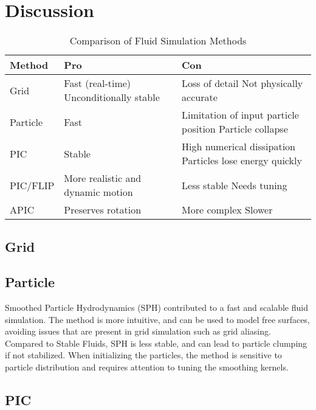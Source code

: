 \section{Discussion}
\begin{table}[!htbp]
\centering
\caption{Comparison of Fluid Simulation Methods}
\label{tab:fluid_comparison}
\begin{tabularx}{\columnwidth}{l X X}
\toprule
\textbf{Method} & \textbf{Pro} & \textbf{Con} \\
\midrule
Grid&
Fast (real-time) \newline
Unconditionally stable &
Loss of detail \newline
Not physically accurate \\
\midrule
Particle&
Fast &
Limitation of input particle position \newline
Particle collapse \\
\midrule
PIC&
Stable &
High numerical dissipation \newline
Particles lose energy quickly \\
\midrule
PIC/FLIP &
More realistic and dynamic motion &
Less stable \newline
Needs tuning \\
\midrule
APIC &
Preserves rotation &
More complex \newline
Slower \\
\bottomrule
\end{tabularx}
\end{table}

\subsection{Grid}

\subsection{Particle}
Smoothed Particle Hydrodynamics (SPH) contributed to a fast and scalable fluid simulation. The method is more intuitive, and can be used to model free surfaces, avoiding issues that are present in grid simulation such as grid aliasing.
Compared to Stable Fluids, SPH is less stable, and can lead to particle clumping if not stabilized. When initializing the particles, the method is sensitive to particle distribution and requires attention to tuning the smoothing kernels.
\subsection{PIC}

